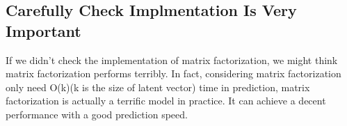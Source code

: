 \documentclass[12pt]{article}
\begin{document}
\subsection{Carefully Check Implmentation Is Very Important}
If we didn't check the implementation of matrix factorization, we might think matrix factorization performs terribly. In fact, considering matrix factorization only need O(k)(k is the size of latent vector) time in prediction, matrix factorization is actually a terrific model in practice. It can achieve a decent performance with a good prediction speed.




	
\end{document}
